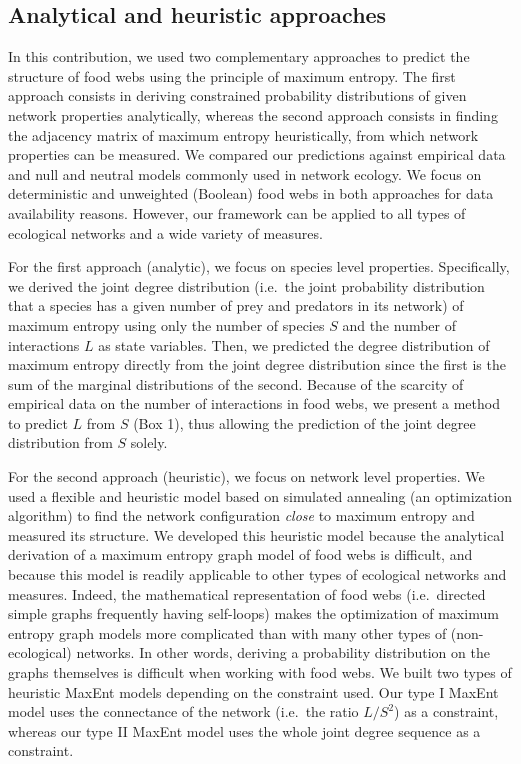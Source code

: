 \documentclass[10pt,oneside]{article}
\begin{document}
\hypertarget{analytical-and-heuristic-approaches}{%
\subsection{Analytical and heuristic
approaches}\label{analytical-and-heuristic-approaches}}

In this contribution, we used two complementary approaches to predict
the structure of food webs using the principle of maximum entropy. The
first approach consists in deriving constrained probability
distributions of given network properties analytically, whereas the
second approach consists in finding the adjacency matrix of maximum
entropy heuristically, from which network properties can be measured. We
compared our predictions against empirical data and null and neutral
models commonly used in network ecology. We focus on deterministic and
unweighted (Boolean) food webs in both approaches for data availability
reasons. However, our framework can be applied to all types of
ecological networks and a wide variety of measures.

For the first approach (analytic), we focus on species level properties.
Specifically, we derived the joint degree distribution (i.e.~the joint
probability distribution that a species has a given number of prey and
predators in its network) of maximum entropy using only the number of
species \(S\) and the number of interactions \(L\) as state variables.
Then, we predicted the degree distribution of maximum entropy directly
from the joint degree distribution since the first is the sum of the
marginal distributions of the second. Because of the scarcity of
empirical data on the number of interactions in food webs, we present a
method to predict \(L\) from \(S\) (Box 1), thus allowing the prediction
of the joint degree distribution from \(S\) solely.

For the second approach (heuristic), we focus on network level
properties. We used a flexible and heuristic model based on simulated
annealing (an optimization algorithm) to find the network configuration
\emph{close} to maximum entropy and measured its structure. We developed
this heuristic model because the analytical derivation of a maximum
entropy graph model of food webs is difficult, and because this model is
readily applicable to other types of ecological networks and measures.
Indeed, the mathematical representation of food webs (i.e.~directed
simple graphs frequently having self-loops) makes the optimization of
maximum entropy graph models more complicated than with many other types
of (non-ecological) networks. In other words, deriving a probability
distribution on the graphs themselves is difficult when working with
food webs. We built two types of heuristic MaxEnt models depending on
the constraint used. Our type I MaxEnt model uses the connectance of the
network (i.e.~the ratio \(L/S^2\)) as a constraint, whereas our type II
MaxEnt model uses the whole joint degree sequence as a constraint.
\end{document}
